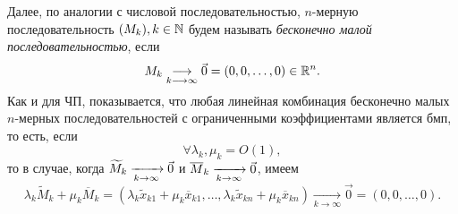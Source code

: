 \documentclass[../../main.tex]{subfiles}
\begin{document}
  Далее, по аналогии с числовой последовательностью, 
  $n$-мерную последовательность $(M_k),  k \in \mathbb{N} $
  будем называть \emph{бесконечно малой последовательностью}, если
  \[
    M_k \underset{k \longrightarrow \infty}
    {\longrightarrow}\vec{0} = (0,0,\dots,0) \in \mathbb{R}^n.
  \]
  Как и для ЧП, показывается, что любая линейная 
  комбинация бесконечно малых $n$-мерных последовательностей с 
  ограниченными коэффициентами является бмп, то есть, если
  \[
    \forall \lambda_k, \mu_{k} = O(1),
  \]
  то в случае, когда $\widetilde{M}_k \xrightarrow[k \to \infty]{}\vec0$ и
  $\overline{M}_k \xrightarrow[k \to \infty]{}\vec0$, имеем
  \[
    \lambda_k \widetilde{M}_k + \mu_k \overline{M}_k =
    (\lambda_k \widetilde{x}_{k1} + \mu_k \overline{x}_{k1}, 
    \dots,
    \lambda_k \widetilde{x}_{kn} + \mu_k \overline{x}_{kn}
    )
    \underset{k \longrightarrow \infty}{\longrightarrow}
    \vec{0} = (0,0,\dots,0).
  \]
\end{document}
